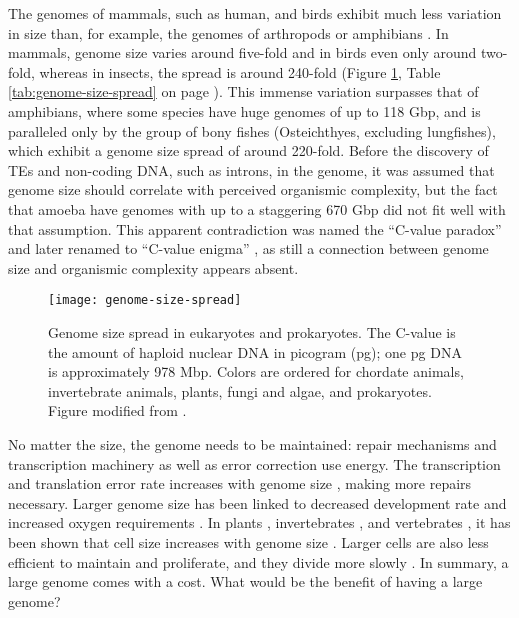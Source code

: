 The genomes of mammals, such as human, and birds exhibit much less
variation in size than, for example, the genomes of arthropods or
amphibians \citep{Gregory2005}. In mammals, genome size varies around
five-fold and in birds even only around two-fold, whereas in insects,
the spread is around 240-fold (Figure \ref{fig:genome-size-spread},
Table \ref{tab:genome-size-spread} on page
\pageref{tab:genome-size-spread}). This immense variation surpasses that
of amphibians, where some species have huge genomes of up to 118 Gbp,
and is paralleled only by the group of bony fishes (Osteichthyes,
excluding lungfishes), which exhibit a genome size spread of around
220-fold. Before the discovery of TEs and non-coding DNA, such as
introns, in the genome, it was assumed that genome size should correlate
with perceived organismic complexity, but the fact that amoeba have
genomes with up to a staggering 670 Gbp \citep{Parfrey2008} did not fit
well with that assumption. This apparent contradiction was named the
``C-value paradox'' and later renamed to ``C-value enigma''
\citep{Gregory2007}, as still a connection between genome size and
organismic complexity appears absent.

\begin{figure}
\centering
\texttt{[image: genome-size-spread]}
\caption[Genome size spread in eukaryotes and prokaryotes]{Genome size
spread in eukaryotes and prokaryotes. The C-value is the amount of
haploid nuclear DNA in picogram (pg); one pg DNA is approximately 978
Mbp. Colors are ordered for chordate animals, invertebrate animals,
plants, fungi and algae, and prokaryotes.  Figure modified from
\citet{Gregory2004}.}
\label{fig:genome-size-spread}
\end{figure}

No matter the size, the genome needs to be maintained: repair mechanisms
and transcription machinery as well as error correction use energy. The
transcription and translation error rate increases with genome size
\citep{Zaher2009}, making more repairs necessary. Larger genome size has
been linked to decreased development rate \citep{White2000} and
increased oxygen requirements \citep{Vinogradov1997, Gregory2002}. In
plants \citep{Grime1983}, invertebrates \citep{Gregory2005}, and
vertebrates \citep{Horner1983, Olmo1982, Gregory2000}, it has been shown
that cell size increases with genome size \citep{Dufresne2011}. Larger
cells are also less efficient to maintain and proliferate, and they
divide more slowly \citep{Bennett1977}. In summary, a large genome comes
with a cost. What would be the benefit of having a large genome?

